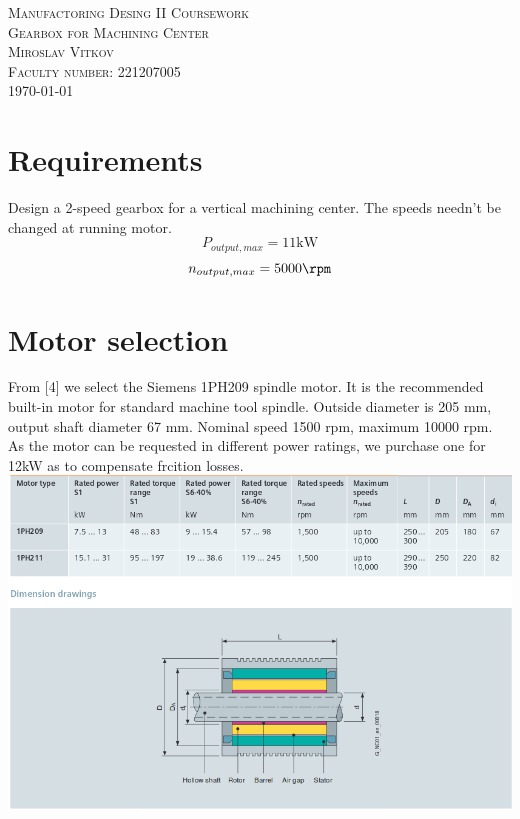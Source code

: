 \documentclass{article}
\begin{document}
\begin{titlepage}
\begin{center}
\textsc{\Large Manufactoring Desing II Coursework}\\[1cm]
\textsc{\Huge Gearbox for Machining Center}\\[1.5cm]
\textsc{\Large Miroslav Vitkov}\\[0.5cm]
\textsc{Faculty number: 221207005}\\[1.5cm]
\vfill
\today
\end{center}
\end{titlepage}

\section{Requirements}
Design a 2-speed gearbox for a vertical machining center.
The speeds needn't be changed at running motor. \\
$$P_{output, max} = 11 \si{\kilo\watt}$$
$$n_{output, max} = 5000 \si{\rpm}$$

\section{Motor selection}
From [4] we select the Siemens 1PH209 spindle motor.
It is the recommended built-in motor for standard machine tool spindle.
Outside diameter is 205 mm, output shaft diameter 67 mm.
Nominal speed 1500 rpm, maximum 10000 rpm.
As the motor can be requested in different power ratings, we purchase one for 12kW as to compensate frcition losses.
\\
\includegraphics[width=1.25\textwidth]{images/motor}~
\end{document}

